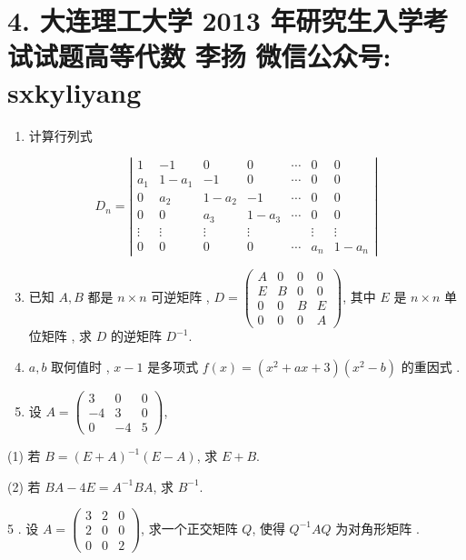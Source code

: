\documentclass[10pt]{article}
\begin{document}
{\begin{enumerate}
\end{enumerate}
\section{4. 大连理工大学 2013 年研究生入学考试试题高等代数 
 李扬 
 微信公众号: sxkyliyang}
\begin{enumerate}
  \item  计算行列式 
\end{enumerate}
$$
D_{n}=\left|\begin{array}{ccccccc}
1 & -1 & 0 & 0 & \cdots & 0 & 0 \\
a_{1} & 1-a_{1} & -1 & 0 & \cdots & 0 & 0 \\
0 & a_{2} & 1-a_{2} & -1 & \cdots & 0 & 0 \\
0 & 0 & a_{3} & 1-a_{3} & \cdots & 0 & 0 \\
\vdots & \vdots & \vdots & \vdots & & \vdots & \vdots \\
0 & 0 & 0 & 0 & \cdots & a_{n} & 1-a_{n}
\end{array}\right|
$$

\begin{enumerate}
  \setcounter{enumi}{2}
  \item  已知  $A, B$  都是  $n \times n$  可逆矩阵 , $D=\left(\begin{array}{cccc}A & 0 & 0 & 0 \\ E & B & 0 & 0 \\ 0 & 0 & B & E \\ 0 & 0 & 0 & A\end{array}\right)$,  其中  $E$  是  $n \times n$  单位矩阵 ,  求  $D$  的逆矩阵  $D^{-1}$.

  \item $a, b$  取何值时 , $x-1$  是多项式  $f(x)=\left(x^{2}+a x+3\right)\left(x^{2}-b\right)$  的重因式 .

  \item  设  $A=\left(\begin{array}{ccc}3 & 0 & 0 \\ -4 & 3 & 0 \\ 0 & -4 & 5\end{array}\right)$,

\end{enumerate}
(1)  若  $B=(E+A)^{-1}(E-A)$,  求  $E+B$.

(2)  若  $B A-4 E=A^{-1} B A$,  求  $B^{-1}$.

5 .  设  $A=\left(\begin{array}{lll}3 & 2 & 0 \\ 2 & 0 & 0 \\ 0 & 0 & 2\end{array}\right)$,  求一个正交矩阵  $Q$,  使得  $Q^{-1} A Q$  为对角形矩阵 .

}
\end{document}
